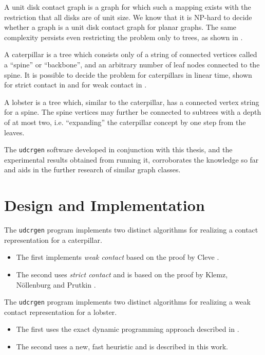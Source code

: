 \documentclass[draft,final]{vutinfth} %
\begin{document}
A unit disk contact graph is a graph for which such a mapping exists with the restriction that all disks are of unit size.
We know that it is NP-hard to decide whether a graph is a unit disk contact graph for planar graphs.
The same complexity persists even restricting the problem only to trees, as shown in \cite{Cleve2020}.

A caterpillar is a tree which consists only of a string of connected vertices called a “spine” or “backbone”, and an arbitrary number of leaf nodes connected to the spine.
It is possible to decide the problem for caterpillars in linear time, shown for strict contact in \cite{Klemz2015} and for weak contact in \cite{Cleve2020}.

A lobster is a tree which, similar to the caterpillar, has a connected vertex string for a spine.
The spine vertices may further be connected to subtrees with a depth of at most two, i.e. “expanding” the caterpillar concept by one step from the leaves.

The \texttt{udcrgen} software developed in conjunction with this thesis, and the experimental results obtained from running it, corroborates the knowledge so far and aids in the further research of similar graph classes.

\chapter{Design and Implementation}

The \texttt{udcrgen} program implements two distinct algorithms for realizing a contact representation for a caterpillar.

\begin{itemize}
    \item The first implements \emph{weak contact} based on the proof by Cleve \cite{Cleve2020}.
    \item The second uses \emph{strict contact} and is based on the proof by Klemz, Nöllenburg and Prutkin \cite{Klemz2015}.
\end{itemize}

The \texttt{udcrgen} program implements two distinct algorithms for realizing a weak contact representation for a lobster.

\begin{itemize}
    \item The first uses the exact dynamic programming approach described in \cite{DBLP:journals/corr/abs-2103-08416}.
    \item The second uses a new, fast heuristic and is described in this work.
\end{itemize}
\end{document}
